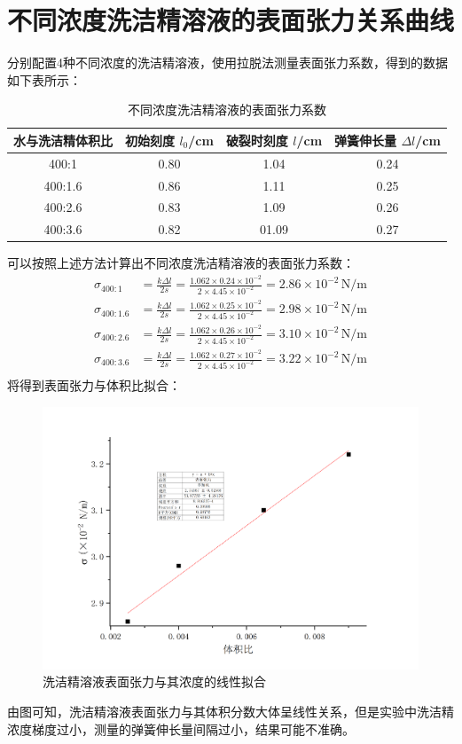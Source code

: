 \documentclass[a4paper]{extarticle}
\begin{document}
    \section{不同浓度洗洁精溶液的表面张力关系曲线}
    分别配置4种不同浓度的洗洁精溶液，使用拉脱法测量表面张力系数，得到的数据如下表所示：
    \begin{table}[H]
        \centering
        \caption{不同浓度洗洁精溶液的表面张力系数}
        \begin{tabular}{cccc}
            \toprule
            水与洗洁精体积比 & 初始刻度 $l_0$/cm & 破裂时刻度 $l$/cm & 弹簧伸长量 $\Delta l$/cm\\
            \midrule
            400:1 & 0.80 & 1.04 & 0.24\\
            400:1.6 & 0.86 & 1.11 & 0.25\\
            400:2.6 & 0.83 & 1.09 & 0.26\\
            400:3.6 & 0.82 & 01.09 & 0.27\\
            \bottomrule
        \end{tabular}
    \end{table}
    可以按照上述方法计算出不同浓度洗洁精溶液的表面张力系数：
    \begin{equation*}
        \begin{aligned}
            \sigma_{400:1} &= \frac{k\Delta l}{2s} =\frac{1.062\times0.24\times10^{-2}}{2\times4.45\times10^{-2}}=2.86\times10^{-2} \,\text{N/m}\\
            \sigma_{400:1.6} &= \frac{k\Delta l}{2s} =\frac{1.062\times0.25\times10^{-2}}{2\times4.45\times10^{-2}}=2.98\times10^{-2} \,\text{N/m}\\
            \sigma_{400:2.6} &= \frac{k\Delta l}{2s} =\frac{1.062\times0.26\times10^{-2}}{2\times4.45\times10^{-2}}=3.10\times10^{-2} \,\text{N/m}\\
            \sigma_{400:3.6} &= \frac{k\Delta l}{2s} =\frac{1.062\times0.27\times10^{-2}}{2\times4.45\times10^{-2}}=3.22\times10^{-2} \,\text{N/m}\\            
        \end{aligned}
    \end{equation*}
    将得到表面张力与体积比拟合：
    \begin{figure}[H]
        \centering
        \includegraphics[width=0.8\linewidth]{2.png}
        \caption{洗洁精溶液表面张力与其浓度的线性拟合}
    \end{figure}
    由图可知，洗洁精溶液表面张力与其体积分数大体呈线性关系，但是实验中洗洁精浓度梯度过小，测量的弹簧伸长量间隔过小，结果可能不准确。
    \newpage
\end{document}
